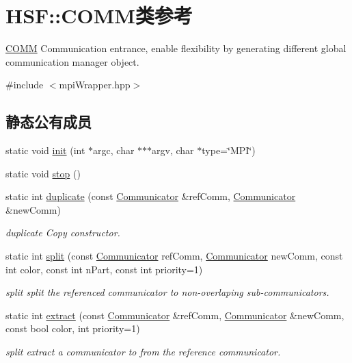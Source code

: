\hypertarget{classHSF_1_1COMM}{
\section{HSF::COMM类参考}
\label{classHSF_1_1COMM}
}


\hyperlink{classHSF_1_1COMM}{COMM} Communication entrance, enable flexibility by generating different global communication manager object.  


{\ttfamily \#include $<$mpiWrapper.hpp$>$}\subsection*{静态公有成员}
\begin{DoxyCompactItemize}
\item 
static void \hyperlink{classHSF_1_1COMM_a7132936c593ca869e3cf2ab967ea187e}{init} (int $\ast$argc, char $\ast$$\ast$$\ast$argv, char $\ast$type=\char`\"{}MPI\char`\"{})
\item 
static void \hyperlink{classHSF_1_1COMM_a90b5eb0d97e94e3eb00e534d7817f67e}{stop} ()
\item 
static int \hyperlink{classHSF_1_1COMM_a093162ff2492f8f27d86cb998ff52f10}{duplicate} (const \hyperlink{classHSF_1_1Communicator}{Communicator} \&refComm, \hyperlink{classHSF_1_1Communicator}{Communicator} \&newComm)
\begin{DoxyCompactList}\small\item\em duplicate Copy constructor. \item\end{DoxyCompactList}\item 
static int \hyperlink{classHSF_1_1COMM_a1e80b3cf7e5fdf42c7e4461adfa116bc}{split} (const \hyperlink{classHSF_1_1Communicator}{Communicator} refComm, \hyperlink{classHSF_1_1Communicator}{Communicator} newComm, const int color, const int nPart, const int priority=1)
\begin{DoxyCompactList}\small\item\em split split the referenced communicator to non-\/overlaping sub-\/communicators. \item\end{DoxyCompactList}\item 
static int \hyperlink{classHSF_1_1COMM_a098fb0d3618c3ff9cd18f25eed6c8c25}{extract} (const \hyperlink{classHSF_1_1Communicator}{Communicator} \&refComm, \hyperlink{classHSF_1_1Communicator}{Communicator} \&newComm, const bool color, int priority=1)
\begin{DoxyCompactList}\small\item\em split extract a communicator to from the reference communicator. \item\end{DoxyCompactList}\item 

\end{DoxyCompactItemize}
